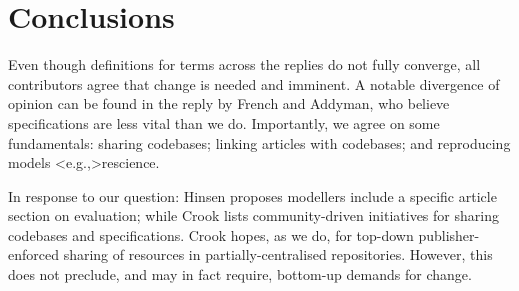 \documentclass[jou]{apa6}
\begin{document}
\section{Conclusions}
Even though definitions for terms across the replies do not fully converge, all contributors agree that change is needed and imminent.
A notable divergence of opinion can be found in the reply by French and Addyman, who believe specifications are less vital than we do.
Importantly, we agree on some fundamentals: sharing codebases; linking articles with codebases; and reproducing models \citeA<e.g.,>{rescience}.

In response to our question: Hinsen proposes modellers include a specific article section on evaluation; while Crook lists community-driven initiatives for sharing codebases and specifications. 
Crook hopes, as we do, for top-down publisher-enforced sharing of resources in partially-centralised repositories.
However, this does not preclude, and may in fact require, bottom-up demands for change.



\hspace*{1cm}
\end{document}
